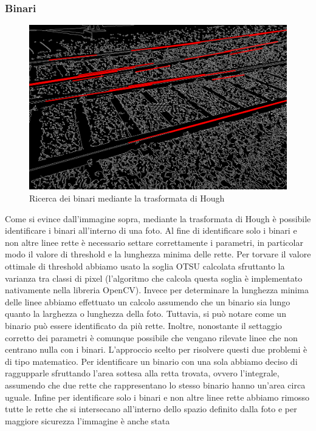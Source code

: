 \documentclass[twoside]{supsistudent}
\begin{document}
\subsubsection{Binari}
\begin{figure}[H]
  \center
  \includegraphics[scale=0.25]{images/houghLines.png}
  \caption{Ricerca dei binari mediante la trasformata di Hough}
\end{figure}
Come si evince dall'immagine sopra, mediante la trasformata di Hough è possibile identificare 
i binari all'interno di una foto. Al fine di identificare solo i binari e non altre linee rette
è necessario settare correttamente i parametri, in particolar modo il valore di threshold e 
la lunghezza minima delle rette. Per torvare il valore ottimale di threshold abbiamo usato la soglia OTSU 
calcolata sfruttanto la varianza tra classi di pixel (l'algoritmo che calcola questa soglia è implementato nativamente
nella libreria OpenCV). Invece per determinare la lunghezza minima delle linee abbiamo effettuato un calcolo 
assumendo che un binario sia lungo quanto la larghezza o lunghezza della foto. Tuttavia, si può notare
come un binario può essere identificato da più rette. Inoltre, nonostante il settaggio corretto dei parametri 
è comunque possibile che vengano rilevate linee che non centrano nulla con i binari. L'approccio scelto
per risolvere questi due problemi è di tipo matematico. Per identificare un binario con una sola abbiamo deciso di raggupparle
sfruttando l'area sottesa alla retta trovata, ovvero l'integrale, assumendo che due rette che rappresentano lo stesso binario 
hanno un'area circa uguale. Infine per identificare solo i binari e non altre linee rette abbiamo rimosso 
tutte le rette che si intersecano all'interno dello spazio definito dalla foto e per maggiore sicurezza l'immagine è anche stata 
\end{document}

